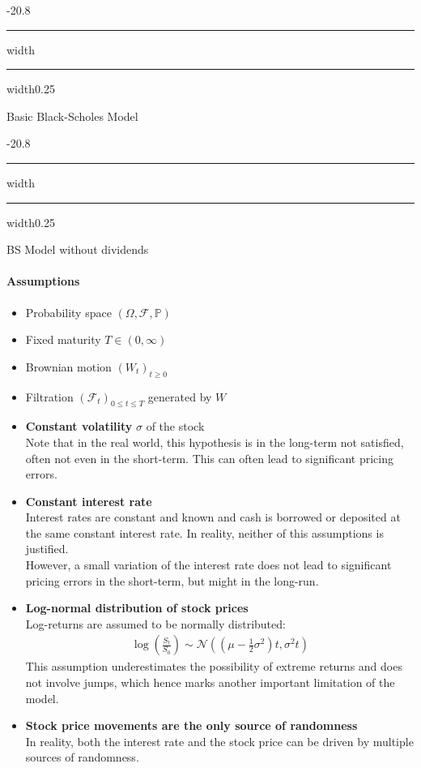 \documentclass[a4paper,landscape,7pt,fleqn]{scrartcl}
\makeatletter
\renewcommand{\emph}[1]{\textbf{#1}}
\renewcommand{\section}{\@startsection{section}{1}{0mm}%
{-2\baselineskip}{0.8\baselineskip}%
{\hrule depth 0.2pt width\columnwidth\hrule depth1.5pt
width0.25\columnwidth\vspace*{1.2em}\Large\bfseries}}
\renewcommand{\subsection}{\@startsection{subsection}{1}{0mm}%
{-2\baselineskip}{0.8\baselineskip}%
{\hrule depth 0.2pt width\columnwidth\hrule depth0.75pt
width0.25\columnwidth\vspace*{1.2em}\large\bfseries}}
\makeatother
\begin{document}
\begin{multicols*}{3}
\columnbreak

\section{Basic Black-Scholes Model}

\subsection{BS Model without dividends}

\paragraph{Assumptions}
\begin{itemize}
\item Probability space $(\Omega, \mathcal{F}, \mathbb{P})$
\item Fixed maturity $T \in (0,\infty)$
\item Brownian motion $(W_t)_{t \geq 0}$
\item Filtration $(\mathcal{F}_t)_{0 \leq t \leq T}$ generated by $W$
\item \emph{Constant volatility} $\sigma$ of the stock \\
Note that in the real world, this hypothesis is in the long-term not satisfied, often not even in the short-term. This can often lead to significant pricing errors.
\item \emph{Constant interest rate} \\
Interest rates are constant and known and cash is borrowed or deposited at the same constant interest rate. In reality, neither of this assumptions is justified. \\
However, a small variation of the interest rate does not lead to significant pricing errors in the short-term, but might in the long-run.
\item \emph{Log-normal distribution of stock prices} \\
Log-returns are assumed to be normally distributed:
\begin{align*}
\log \left( \frac{S_t}{S_0} \right) \sim \mathcal{N} \left( \left( \mu - \frac{1}{2} \sigma^2 \right) t, \sigma^2 t \right)
\end{align*}
This assumption underestimates the possibility of extreme returns and does not involve jumps, which hence marks another important limitation of the model.
\item \emph{Stock price movements are the only source of randomness} \\
In reality, both the interest rate and the stock price can be driven by multiple sources of randomness.
\end{itemize}


\end{multicols*}
\end{document}
